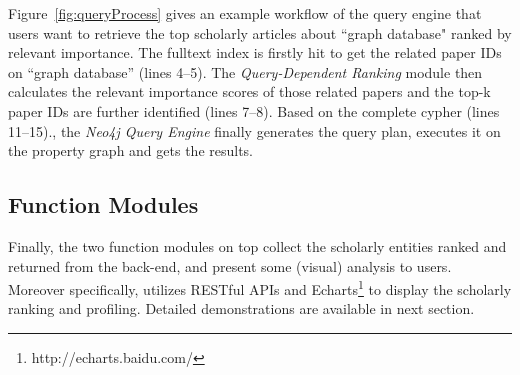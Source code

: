 Figure~\ref{fig:queryProcess} gives an example workflow of the query engine that users want to retrieve the top scholarly articles about ``graph database"  ranked by relevant importance. The fulltext index is firstly hit to get the related paper IDs on ``graph database'' (lines 4--5). The {\em Query-Dependent Ranking} module then calculates the relevant importance scores of those related papers and the top-k paper IDs are further identified (lines 7--8). Based on the complete cypher (lines 11--15)., the {\em Neo4j Query Engine} finally generates the query plan, executes it on the property graph and gets the results.

\subsection{Function Modules}
Finally, the two function modules on top collect the scholarly entities ranked and returned from the back-end, and present some (visual) analysis to users. Moreover specifically, \oursystem utilizes RESTful APIs  and Echarts\footnote{http://echarts.baidu.com/} to display the scholarly ranking and profiling. Detailed demonstrations are available in next section.






